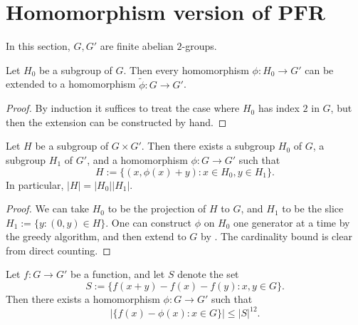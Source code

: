 \chapter{Homomorphism version of PFR}

In this section, $G, G'$ are finite abelian $2$-groups.

\begin{lemma}\label{hb-thm}\leanok  Let $H_0$ be a subgroup of $G$.  Then every homomorphism $\phi: H_0 \to G'$ can be extended to a homomorphism $\tilde \phi: G \to G'$.
\end{lemma}

\begin{proof}\leanok  By induction it suffices to treat the case where $H_0$ has index $2$ in $G$, but then the extension can be constructed by hand.
\end{proof}

\begin{lemma}\label{goursat}\leanok  Let $H$ be a subgroup of $G \times G'$.  Then there exists a subgroup $H_0$ of $G$, a subgroup $H_1$ of $G'$, and a homomorphism $\phi: G \to G'$ such that
$$ H := \{ (x, \phi(x) + y): x \in H_0, y \in H_1 \}.$$
In particular, $|H| = |H_0| |H_1|$.
\end{lemma}

\begin{proof}\leanok We can take $H_0$ to be the projection of $H$ to $G$, and $H_1$ to be the slice $H_1 := \{ y: (0,y) \in H \}$.  One can construct $\phi$ on $H_0$ one generator at a time by the greedy algorithm, and then extend to $G$ by .  The cardinality bound is clear from direct counting.
\end{proof}

\begin{theorem}\label{hom-pfr}\leanok  Let $f: G \to G'$ be a function, and let $S$ denote the set
$$ S := \{ f(x+y)-f(x)-f(y): x,y \in G \}.$$
Then there exists a homomorphism $\phi: G \to G'$ such that
$$ |\{ f(x) - \phi(x): x \in G \}| \leq |S|^{12}.$$
\end{theorem}

